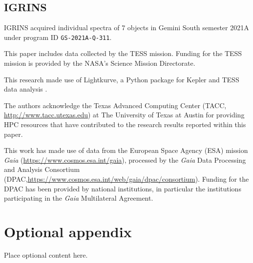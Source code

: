 \documentclass[modern]{aastex631}
\begin{document}
\subsection{IGRINS}
IGRINS acquired  individual spectra of 7 objects in Gemini South semester 2021A under program ID \texttt{GS-2021A-Q-311}.

\begin{acknowledgements}
  This paper includes data collected by the TESS mission. Funding for the TESS mission is provided by the NASA's Science Mission Directorate.

  This research made use of Lightkurve, a Python package for Kepler and TESS data analysis \citep{2018ascl.soft12013L}.

  The authors acknowledge the Texas Advanced Computing Center (TACC, \url{http://www.tacc.utexas.edu}) at The University of Texas at Austin for providing HPC resources that have contributed to the research results reported within this paper.

  This work has made use of data from the European Space Agency (ESA) mission {\it Gaia} (\url{https://www.cosmos.esa.int/gaia}), processed by the {\it Gaia} Data Processing and Analysis Consortium (DPAC,\url{https://www.cosmos.esa.int/web/gaia/dpac/consortium}). Funding for the DPAC
  has been provided by national institutions, in particular the institutions
  participating in the {\it Gaia} Multilateral Agreement.

\end{acknowledgements}

\clearpage








\clearpage

\appendix
\restartappendixnumbering

\section{Optional appendix} \label{appendix:tools}

Place optional content here.
\end{document}
